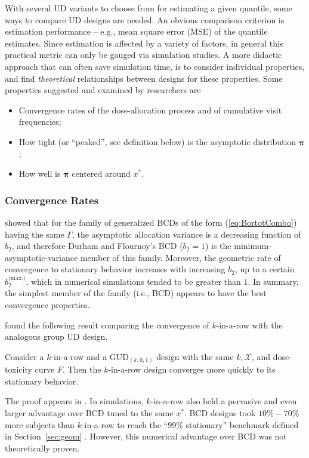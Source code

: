 With several UD variants to choose from for estimating a given quantile, some ways to compare UD designs are needed. An obvious comparison criterion is estimation performance -- e.g., mean square error (MSE) of the quantile estimates. Since estimation is affected by a variety of factors, in general this practical metric can only be gauged via simulation studies. A more didactic approach that can often save simulation time, is to consider individual properties, and find \emph{theoretical} relationships between designs for these properties. Some properties suggested and examined by researchers are

\begin{itemize}
\item Convergence rates of the dose-allocation process and of cumulative visit frequencies;
\item How tight (or ``peaked'', see definition below) is the asymptotic distribution $\boldsymbol{\pi}$;
\item How well is $\boldsymbol{\pi}$ centered around $x^*$.
\end{itemize}

\subsubsection{Convergence Rates}

\cite{Bort:Giov:Upan:2005} showed that for the family of generalized BCDs of the form (\ref{eq:BortotCombo}) having the same $\Gamma$, the asymptotic allocation variance is a decreasing function of $b_2$, and therefore Durham and Flournoy's BCD ($b_2=1$) is the minimum-asymptotic-variance member of this family. Moreover, the geometric rate of convergence to stationary behavior increases with increasing $b_2$, up to a certain $b_2^\textrm{(max.)}$, which in numerical simulations tended to be greater than $1$. In summary, the simplest member of the family (i.e., BCD) appears to have the best convergence properties.

\cite{Oron:Hoff:thek:2009} found the following result comparing the convergence of $k$-in-a-row with the analogous group UD design.

\begin{thm}\label{thm:krgudconv} Consider a $k$-in-a-row and a GUD$_{(k,0,1)}$ design with the same $k,\mathcal{X}$, and dose-toxicity curve $F$. Then the $k$-in-a-row design converges more quickly to its stationary behavior.\end{thm}

\noindent The proof appears in \cite{Oron:Hoff:thek:2009}. In simulations, $k$-in-a-row also held a pervasive and even larger advantage over BCD tuned to the same $x^*$. BCD designs took $10\%-70\%$ more subjects than $k$-in-a-row to reach the ``$99\%$ stationary'' benchmark defined in Section~\ref{sec:geom} \citep{Oron:Hoff:thek:2009}. However, this numerical advantage over BCD was not theoretically proven.

